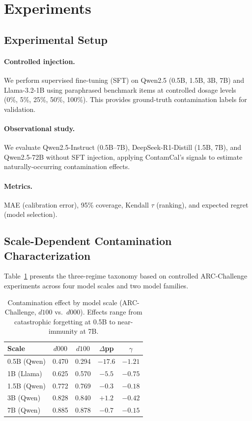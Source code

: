\documentclass[11pt,a4paper]{article}
\begin{document}
\section{Experiments}

\subsection{Experimental Setup}

\paragraph{Controlled injection.} We perform supervised fine-tuning (SFT) on Qwen2.5 (0.5B, 1.5B, 3B, 7B) and Llama-3.2-1B using paraphrased benchmark items at controlled dosage levels (0\%, 5\%, 25\%, 50\%, 100\%). This provides ground-truth contamination labels for validation.

\paragraph{Observational study.} We evaluate Qwen2.5-Instruct (0.5B--7B), DeepSeek-R1-Distill (1.5B, 7B), and Qwen2.5-72B without SFT injection, applying ContamCal's signals to estimate naturally-occurring contamination effects.

\paragraph{Metrics.} MAE (calibration error), 95\% coverage, Kendall $\tau$ (ranking), and expected regret (model selection).

\subsection{Scale-Dependent Contamination Characterization}

Table~\ref{tab:scale} presents the three-regime taxonomy based on controlled ARC-Challenge experiments across four model scales and two model families.

\begin{table}[t]
\centering
\small
\caption{Contamination effect by model scale (ARC-Challenge, $d100$ vs.\ $d000$). Effects range from catastrophic forgetting at 0.5B to near-immunity at 7B.}
\label{tab:scale}
\begin{tabular}{lcccc}
\toprule
Scale & $d000$ & $d100$ & $\Delta$pp & $\gamma$ \\
\midrule
0.5B (Qwen) & 0.470 & 0.294 & $-17.6$ & $-1.21$ \\
1B (Llama) & 0.625 & 0.570 & $-5.5$ & $-0.75$ \\
1.5B (Qwen) & 0.772 & 0.769 & $-0.3$ & $-0.18$ \\
3B (Qwen) & 0.828 & 0.840 & $+1.2$ & $-0.42$ \\
7B (Qwen) & 0.885 & 0.878 & $-0.7$ & $-0.15$ \\
\bottomrule
\end{tabular}
\end{table}
\end{document}
